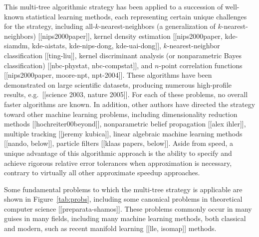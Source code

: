 \documentclass{article}
\begin{document}
This multi-tree algorithmic strategy has been applied to a succession
of well-known statistical learning methods, each representing certain
unique challenges for the strategy, including
all-$k$-nearest-neighbors (a generalization of $k$-nearest-neighbors)
[[nips2000paper]], kernel density estimation [[nips2000paper,
kde-siamdm, kde-aistats, kde-nips-dong, kde-uai-dong]],
$k$-nearest-neighbor classification [[ting-liu]], kernel discriminant
analysis (or nonparametric Bayes classification) [[nbc-phystat,
nbc-compstat]], and $n$-point correlation functions [[nips2000paper,
moore-npt, npt-2004]].  These algorithms have been demonstrated on
large scientific datasets, producing numerous high-profile results,
e.g.~[[science 2003, nature 2005]].  For each of these problems, no
overall faster algorithms are known.  In addition, other authors have
directed the strategy toward other machine learning problems,
including dimensionality reduction methods [[hochreiter00beyond]],
nonparametric belief propagation [[alex ihler]], multiple tracking
[[jeremy kubica]], linear algebraic machine learning methods [[nando,
below]], particle filters [[klaas papers, below]].  Aside from speed,
a unique advantage of this algorithmic approach is the ability to
specify and achieve rigorous relative error tolerances when
approximation is necessary, contrary to virtually all other
approximate speedup approaches.
%
%
%
%
%

Some fundamental problems to which the multi-tree strategy is
applicable are shown in Figure~\ref{tab:probs}, including some canonical
problems in theoretical computer science [[preparata-shamos]].  These
problems commonly occur in many guises in many fields, including many
machine learning methods, both classical and modern, such as recent
manifold learning [[lle, isomap]] methods.
\end{document}

